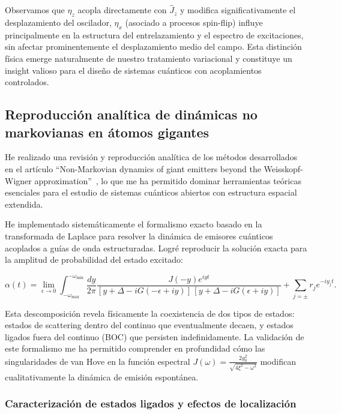 \documentclass[onecolumn,notitlepage,letterpaper,aps,pra,12pt]{article}
\numberwithin{equation}{section}
\begin{document}
Observamos que $\eta_z$ acopla directamente con $\hat{J}_{z}$ y modifica significativamente el desplazamiento del oscilador, $\eta_x$ (asociado a procesos spin-flip) influye principalmente en la estructura del entrelazamiento y el espectro de excitaciones, sin afectar prominentemente el desplazamiento medio del campo. Esta distinción física emerge naturalmente de nuestro tratamiento variacional y constituye un insight valioso para el diseño de sistemas cuánticos con acoplamientos controlados.





\subsection{Reproducción analítica de dinámicas no markovianas en átomos gigantes}

He realizado una revisión y reproducción analítica de los métodos desarrollados en el artículo ``Non-Markovian dynamics of giant emitters beyond the Weisskopf-Wigner approximation''~\cite{gonzalez2025}, lo que me ha permitido dominar herramientas teóricas esenciales para el estudio de sistemas cuánticos abiertos con estructura espacial extendida.

He implementado sistemáticamente el formalismo exacto basado en la transformada de Laplace para resolver la dinámica de emisores cuánticos acoplados a guías de onda estructuradas. Logré reproducir la solución exacta para la amplitud de probabilidad del estado excitado:

\[\alpha(t) = \lim_{\epsilon\to 0}\int_{-\omega_{\max}}^{-\omega_{\min}}\frac{dy}{2\pi}\frac{J(-y)e^{iyt}}{[y+\Delta-iG(-\epsilon+iy)]\,[y+\Delta-iG(\epsilon+iy)]} + \sum_{j=\pm}r_{j}e^{-iy_{j}t}.\]

Esta descomposición revela físicamente la coexistencia de dos tipos de estados: estados de scattering dentro del continuo que eventualmente decaen, y estados ligados fuera del continuo (BOC) que persisten indefinidamente. La validación de este formalismo me ha permitido comprender en profundidad cómo las singularidades de van Hove en la función espectral $J(\omega) = \frac{2g_{0}^{2}}{\sqrt{4\xi^{2}-\omega^{2}}}$ modifican cualitativamente la dinámica de emisión espontánea.

\subsubsection{Caracterización de estados ligados y efectos de localización}
\end{document}
